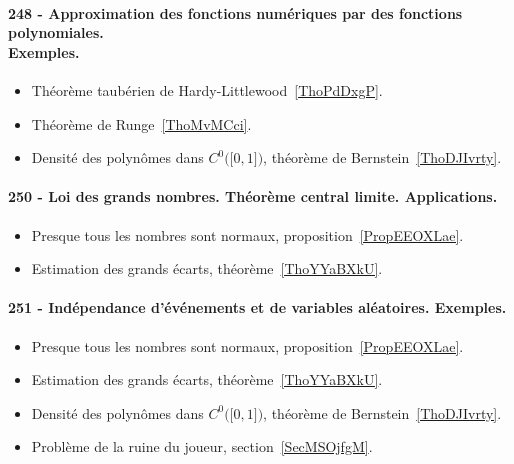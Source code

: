 \paragraph{248 - Approximation des fonctions numériques par des fonctions polynomiales.\\ Exemples.}
\begin{itemize}
	\item Théorème taubérien de Hardy-Littlewood~\ref{ThoPdDxgP}.
	\item Théorème de Runge~\ref{ThoMvMCci}.
	\item Densité des polynômes dans \( C^0\big( \mathopen[ 0 , 1 \mathclose] \big)\), théorème de Bernstein~\ref{ThoDJIvrty}.
\end{itemize}
\paragraph{250 - Loi des grands nombres. Théorème central limite. Applications.}
\begin{itemize}
	\item Presque tous les nombres sont normaux, proposition~\ref{PropEEOXLae}.
	\item Estimation des grands écarts, théorème~\ref{ThoYYaBXkU}.
\end{itemize}
\paragraph{251 - Indépendance d’événements et de variables aléatoires. Exemples.}
\begin{itemize}
	\item Presque tous les nombres sont normaux, proposition~\ref{PropEEOXLae}.
	\item Estimation des grands écarts, théorème~\ref{ThoYYaBXkU}.
	\item Densité des polynômes dans \( C^0\big( \mathopen[ 0 , 1 \mathclose] \big)\), théorème de Bernstein~\ref{ThoDJIvrty}.
	\item Problème de la ruine du joueur, section~\ref{SecMSOjfgM}.
\end{itemize}
